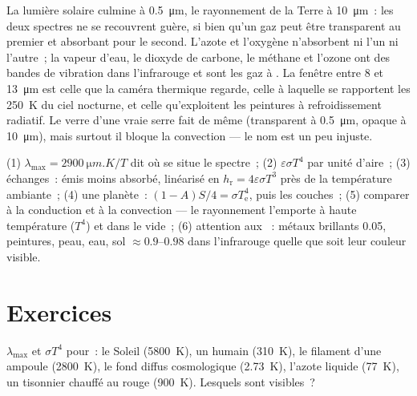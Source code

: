 \begin{remark}\label{rem:b2:thermal-radiation:selective}
La lumière solaire culmine à \qty{0.5}{\micro m}, le rayonnement de la Terre à
\qty{10}{\micro m}~: les deux spectres ne se recouvrent guère, si bien qu'un gaz peut être
transparent au premier et absorbant pour le second. L'azote et l'oxygène
n'absorbent ni l'un ni l'autre~; la vapeur d'eau, le dioxyde de carbone, le méthane et l'ozone
ont des bandes de vibration dans l'infrarouge et sont les gaz à . La
fenêtre entre \qty{8}{} et \qty{13}{\micro m} est celle que la caméra thermique
regarde, celle à laquelle se rapportent les \qty{250}{K} du ciel nocturne, et celle qu'exploitent
les peintures à refroidissement radiatif. Le verre d'une vraie serre fait
de même (transparent à \qty{0.5}{\micro m}, opaque à \qty{10}{\micro m}),
mais surtout il bloque la convection --- le nom est un peu injuste.
\end{remark}

\begin{method}\label{meth:b2:thermal-radiation:method}
(1) $\lambda_{\max} = \qty{2900}{\micro m.K}/T$ dit où se situe le spectre~;
(2) $\varepsilon\sigma T^4$ par unité d'aire~; (3) échanges~: émis
moins absorbé, linéarisé en $h_{\text{r}} = 4\varepsilon\sigma T^3$ près de la
température ambiante~; (4) une planète~: $(1 - A)S/4 = \sigma T_{\text{e}}^4$, puis
les couches~; (5) comparer à la conduction et à la convection --- le rayonnement
l'emporte à haute température ($T^4$) et dans le vide~; (6) attention aux ~:
métaux brillants \qty{0.05}{}, peintures, peau, eau, sol $\approx 0.9$--$0.98$
dans l'infrarouge quelle que soit leur couleur visible.
\end{method}

\section{Exercices}

\begin{exercise}[$\star$]\label{exo:b2:thermal-radiation:1}
$\lambda_{\max}$ et $\sigma T^4$ pour~: le Soleil (\qty{5800}{K}), un humain
(\qty{310}{K}), le filament d'une ampoule (\qty{2800}{K}), le fond diffus cosmologique
(\qty{2.73}{K}), l'azote liquide (\qty{77}{K}), un tisonnier chauffé au rouge
(\qty{900}{K}). Lesquels sont visibles~?
\end{exercise}

